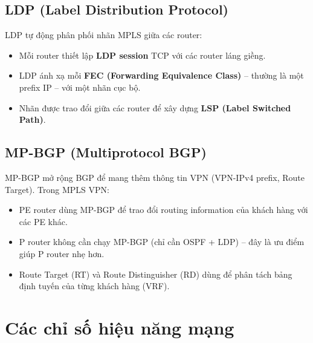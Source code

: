 \subsection{LDP (Label Distribution Protocol)}

LDP tự động phân phối nhãn MPLS giữa các router:
\begin{itemize}
    \item Mỗi router thiết lập \textbf{LDP session} TCP với các router láng giềng.
    \item LDP ánh xạ mỗi \textbf{FEC (Forwarding Equivalence Class)} – thường là một prefix IP – với một nhãn cục bộ.
    \item Nhãn được trao đổi giữa các router để xây dựng \textbf{LSP (Label Switched Path)}.
\end{itemize}

\subsection{MP-BGP (Multiprotocol BGP)}

MP-BGP mở rộng BGP để mang thêm thông tin VPN (VPN-IPv4 prefix, Route Target). Trong MPLS VPN:
\begin{itemize}
    \item PE router dùng MP-BGP để trao đổi routing information của khách hàng với các PE khác.
    \item P router không cần chạy MP-BGP (chỉ cần OSPF + LDP) – đây là ưu điểm giúp P router nhẹ hơn.
    \item Route Target (RT) và Route Distinguisher (RD) dùng để phân tách bảng định tuyến của từng khách hàng (VRF).
\end{itemize}

\section{Các chỉ số hiệu năng mạng}

